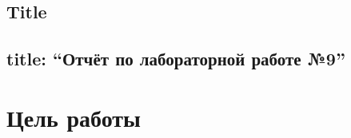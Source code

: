 \documentclass[
  english,
  russian,
  12pt,
  a4paper,
  DIV=11,
  numbers=noendperiod]{scrreprt}
\author{}
\date{}
\renewcommand*\contentsname{Содержание}
\newcommand\contentsname{Содержание}
\begin{document}
\renewcommand*\contentsname{Содержание}
{
\setcounter{tocdepth}{1}
\tableofcontents
}
\listoffigures
\listoftables

\section{Title}\label{title}

\section{\texorpdfstring{title: \enquote{Отчёт по лабораторной работе
№9}}{title: ``Отчёт по лабораторной работе №9''}}\label{title-ux43eux442ux447ux451ux442-ux43fux43e-ux43bux430ux431ux43eux440ux430ux442ux43eux440ux43dux43eux439-ux440ux430ux431ux43eux442ux435-9}

\chapter{Цель
работы}\label{ux446ux435ux43bux44c-ux440ux430ux431ux43eux442ux44b}
\end{document}
